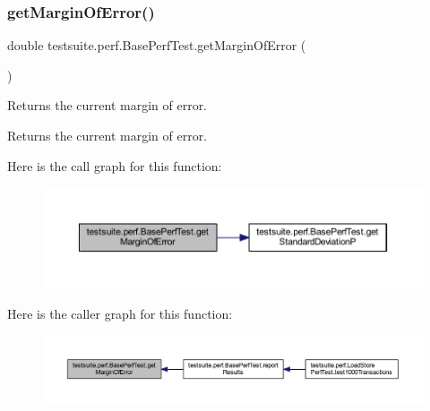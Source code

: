 \subsubsection{\texorpdfstring{get\+Margin\+Of\+Error()}{getMarginOfError()}}
{\footnotesize\ttfamily double testsuite.\+perf.\+Base\+Perf\+Test.\+get\+Margin\+Of\+Error (\begin{DoxyParamCaption}{ }\end{DoxyParamCaption})\hspace{0.3cm}{\ttfamily [protected]}}

Returns the current margin of error.

\begin{DoxyReturn}{Returns}
the current margin of error. 
\end{DoxyReturn}
Here is the call graph for this function\+:
\nopagebreak
\begin{figure}[H]
\begin{center}
\leavevmode
\includegraphics[width=350pt]{classtestsuite_1_1perf_1_1_base_perf_test_a9206b0e839cce6e668eec8c2cd94bc5c_cgraph}
\end{center}
\end{figure}
Here is the caller graph for this function\+:
\nopagebreak
\begin{figure}[H]
\begin{center}
\leavevmode
\includegraphics[width=350pt]{classtestsuite_1_1perf_1_1_base_perf_test_a9206b0e839cce6e668eec8c2cd94bc5c_icgraph}
\end{center}
\end{figure}
\mbox{\label{classtestsuite_1_1perf_1_1_base_perf_test_a27382fb187f93da07deaa8b4ce1cc3e9}} 
